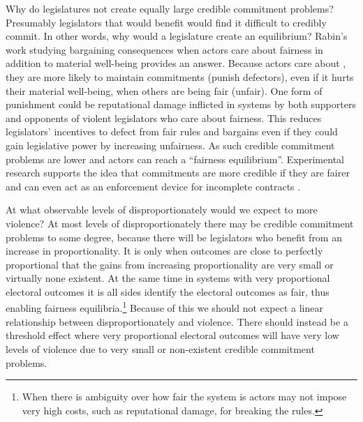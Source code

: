 \documentclass[a4paper]{article}\usepackage[]{graphicx}\usepackage[]{color}
\begin{document}
Why do  legislatures  not create equally large credible commitment problems? Presumably legislators that would benefit  would find it difficult to credibly commit. In other words, why would a  legislature  create an equilibrium? Rabin's \citeyearpar{Rabin1993} work studying bargaining consequences when actors care about fairness in addition to material well-being provides an answer. Because actors care about , they are more likely to maintain commitments (punish defectors), even if it hurts their material well-being, when others are being fair (unfair). One form of punishment could be reputational damage inflicted in  systems by both supporters and opponents of violent legislators who care about fairness. This reduces legislators' incentives to defect from fair rules and bargains even if they could gain legislative power by increasing unfairness. As such credible commitment problems are lower and actors can reach a ``fairness equilibrium''. Experimental research supports the idea that commitments are more credible if they are fairer \citep{Ellingsen2004} and can even act as an enforcement device for incomplete contracts \citep[for a review]{Fehr2008}.

At what observable levels of disproportionately would we expect to  more violence? At most levels of disproportionately there may be credible commitment problems to some degree, because there will be legislators who benefit from an increase in proportionality. It is only when outcomes are close to perfectly proportional that the gains from increasing proportionality are very small or virtually none existent. At the same time in systems with very proportional electoral outcomes it is  all sides identify the electoral outcomes as fair, thus enabling fairness equilibria.\footnote{When there is ambiguity over how fair the system is actors may not impose very high costs, such as reputational damage, for breaking the rules.} Because of this we should not expect a linear relationship between disproportionately and violence. There should instead be a threshold effect where very proportional electoral outcomes will have very low levels of violence due to very small or non-existent credible commitment problems.
\end{document}
